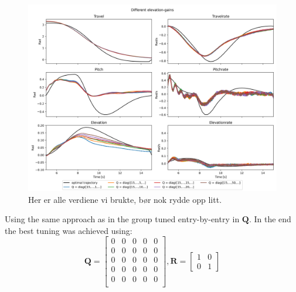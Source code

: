 \documentclass[../main.tex]{subfiles}
\begin{document}
\begin{figure}[h]
	\centering
	\includegraphics[width=\linewidth]{figures/LAB4_elevation_gains.png}
	\caption{Her er alle verdiene vi brukte, bør nok rydde opp litt.}
	\label{fig:lab4_diff_elevation_values}
\end{figure}

Using the same approach as in the group tuned entry-by-entry in $ \bm Q $. In the end the best tuning was achieved using: 
\begin{equation}\label{key}
	\bm Q = \begin{bmatrix}
		0 & 0 & 0 & 0 & 0 \\
		0 & 0 & 0 & 0 & 0 \\
		0 & 0 & 0 & 0 & 0 \\
		0 & 0 & 0 & 0 & 0 \\
		0 & 0 & 0 & 0 & 0 \\
	\end{bmatrix}, 
	\bm R = \begin{bmatrix}
		1 & 0 \\ 
		0 & 1
	\end{bmatrix}
\end{equation}
\end{document}
